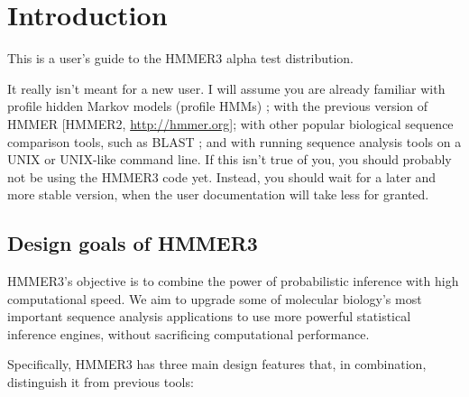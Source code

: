 \section{Introduction}

This is a user's guide to the HMMER3 alpha test distribution. 

It really isn't meant for a new user. I will assume you are already
familiar with profile hidden Markov models (profile HMMs)
\citep{Krogh94,Eddy98,Durbin98}; with the previous version of HMMER
[HMMER2, \url{http://hmmer.org}]; with other popular biological
sequence comparison tools, such as BLAST \citep{Altschul97}; and with
running sequence analysis tools on a UNIX or UNIX-like command
line. If this isn't true of you, you should probably not be using the
HMMER3 code yet. Instead, you should wait for a later and more stable
version, when the user documentation will take less for granted.

\subsection{Design goals of HMMER3}

HMMER3's objective is to combine the power of probabilistic inference
with high computational speed. We aim to upgrade some of molecular
biology's most important sequence analysis applications to use more
powerful statistical inference engines, without sacrificing
computational performance.

Specifically, HMMER3 has three main design features that, in
combination, distinguish it from previous tools:

